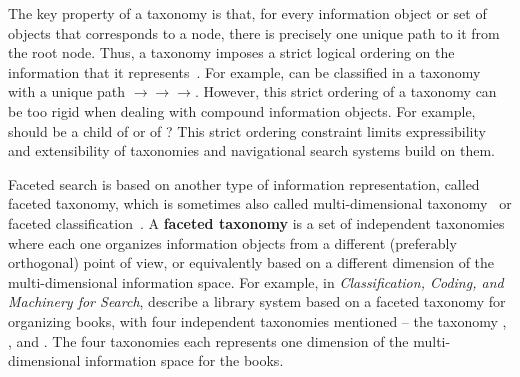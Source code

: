 The key property of a taxonomy is that, for every information object or set of objects that corresponds to a node, there is precisely one unique path to it from the root node. Thus, a taxonomy imposes a strict logical ordering on the information that it represents~\cite{tunkelang2009faceted}. For example,  can be classified in a taxonomy with a unique path  $\rightarrow$$\rightarrow$$\rightarrow$. However, this strict ordering of a taxonomy can be too rigid when dealing with compound information objects. For example, should  be a child of  or of ? This strict ordering constraint limits expressibility and extensibility of taxonomies and navigational search systems build on them.

Faceted search is based on another type of information representation, called faceted taxonomy, which is sometimes also called multi-dimensional  taxonomy~\cite{sacco2009dynamic} or faceted classification~\cite{tunkelang2009faceted}. A \textbf{faceted taxonomy} is a set of independent taxonomies where each one organizes information objects from a different (preferably orthogonal) point of view, or equivalently based on a different dimension of the multi-dimensional information space. For example, in \textit{Classification, Coding, and Machinery for Search}, \citet{ranganathan1950classification} describe a library system based on a faceted taxonomy for organizing books, with four independent taxonomies mentioned -- the taxonomy , ,  and . The four taxonomies each represents one dimension of the multi-dimensional information space for the books. 


